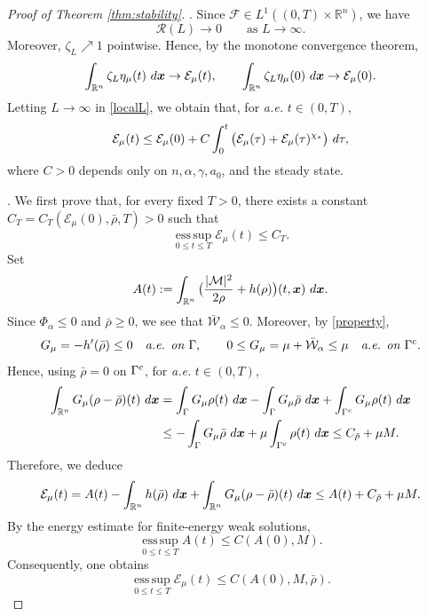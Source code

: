 \documentclass[10pt,a4paper]{amsart}
\def\dd{{\, \rm d}}
\begin{document}
\begin{proof}[Proof of {\rm Theorem \ref{thm:stability}}]
. 
Since $ \mathcal{F}\in L^1((0,T)\times\mathbb R^n)$, we have
\[
 \mathcal R(L)\to0
 \qquad\text{as }L\to\infty .
\]
Moreover, $\zeta_L\nearrow1$ pointwise.  Hence, by the monotone convergence
theorem,
\[
\int_{\mathbb R^n}\zeta_L\eta_\mu(t)\,\dd\boldsymbol{x}\to\mathcal E_\mu(t),
  \qquad
\int_{\mathbb R^n}\zeta_L\eta_\mu(0)\,\dd\boldsymbol{x}\to\mathcal E_\mu(0).
\]
Letting $L\to\infty$ in \eqref{localL}, we obtain that, for {\it a.e.} $t\in(0,T)$,
\begin{equation}\label{ODEestimate} \mathcal E_\mu(t)\le
 \mathcal E_\mu(0)
+C\int_0^t\big(\mathcal E_\mu(\tau)+\mathcal E_\mu(\tau)^{\chi_*}\big)\,\dd\tau,
\end{equation}
where $C>0$ depends only on $n,\alpha,\gamma,a_0$, and the steady state.

. We first prove that, for every fixed $T>0$, there exists a constant
$C_T=C_T(\mathcal E_\mu(0),\bar{\rho},T)>0$ such that
\begin{equation}\label{apriorrb}
 \operatorname*{ess\,sup}_{0\le t\le T}\mathcal E_\mu(t)\le C_T .
\end{equation}
Set
\[
 A(t):=\int_{\mathbb R^n}
 \big(\frac{|\mathcal M|^2}{2\rho}+h(\rho)\big)(t,\boldsymbol{x})\,
 \dd\boldsymbol{x}.
\]
Since $\Phi_\alpha\le0$ and $\bar\rho\ge0$, we see that
$\bar{\mathcal W}_\alpha\le0$.  Moreover, by \eqref{property},
\[
 G_\mu=-h'(\bar\rho)\le0
 \quad\hbox{\it a.e. on }\Gamma,
 \qquad
 0\le G_\mu=\mu+\bar{\mathcal W}_\alpha\le\mu
 \quad\hbox{\it a.e. on }\Gamma^{\rm c} .
\]
Hence, using $\bar\rho=0$ on $\Gamma^{\rm c}$, for {\it a.e.} $t\in(0,T)$,
\[
\begin{aligned}
 \int_{\mathbb R^n}G_\mu(\rho-\bar\rho)(t)\,\dd\boldsymbol{x}
 &=
 \int_{\Gamma}G_\mu\rho(t)\,\dd\boldsymbol{x}
 -\int_{\Gamma}G_\mu\bar\rho\,\dd\boldsymbol{x}
 +\int_{\Gamma^{\rm c}}G_\mu\rho(t)\,\dd\boldsymbol{x}  \\
 &\le
 -\int_{\Gamma}G_\mu\bar\rho\,\dd\boldsymbol{x}
 +\mu\int_{\Gamma^{\rm c}}\rho(t)\,\dd\boldsymbol{x}\le
 C_{\bar\rho}+\mu M .
\end{aligned}
\]
Therefore, we deduce
\[
\begin{aligned}
 \mathcal E_\mu(t)
 = A(t)-\int_{\mathbb R^n}h(\bar\rho)\,\dd\boldsymbol{x}
 +\int_{\mathbb R^n}G_\mu(\rho-\bar\rho)(t)\,\dd\boldsymbol{x}\le A(t)+C_{\bar\rho}+\mu M .
\end{aligned}
\]
By the energy estimate for finite-energy weak solutions,
\[
 \operatorname*{ess\,sup}_{0\le t\le T} A(t)
 \le C(A(0),M).
\]
Consequently, one obtains
\[
 \operatorname*{ess\,sup}_{0\le t\le T}\mathcal E_\mu(t)
 \le C(A(0),M,\bar\rho).
\]


\end{proof}
\end{document}

